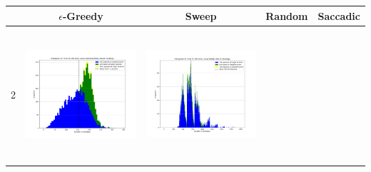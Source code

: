 \begin{landscape}
\begin{table}[h!]
  \centering
  \begin{tabular}{ | c | c | c | c | c |}
    \hline
    & $\epsilon$-Greedy & Sweep & Random & Saccadic \\
    \hline
    2 & 
    \begin{minipage}[c][49mm][c]{49mm}
      \includegraphics[width=49mm, height=49mm]{Chapters/MultiAgentTargetDetection/Figs/Histograms/MultipleTarget/2/2EpsilonGreedyHistogram.png}
    \end{minipage}
    &
    \begin{minipage}[c][49mm][c]{49mm}
      \includegraphics[width=49mm, height=49mm]{Chapters/MultiAgentTargetDetection/Figs/Histograms/MultipleTarget/2/2SweepHistogram.png}


\end{minipage}
\end{tabular}
\end{table}
\end{landscape}
